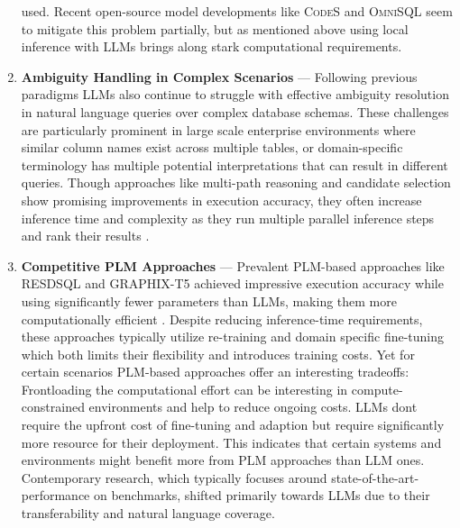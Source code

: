 \begin{enumerate}
           used. Recent open-source model developments like \textsc{CodeS} and \textsc{OmniSQL} seem to mitigate this
           problem partially, but as mentioned above using local inference with LLMs brings along stark computational
           requirements.
    \item \textbf{Ambiguity Handling in Complex Scenarios} — Following previous paradigms LLMs also continue to struggle
           with effective ambiguity resolution in natural language queries over complex database schemas. These challenges
           are particularly prominent in large scale enterprise environments where similar column names exist across multiple
           tables, or domain-specific terminology has multiple potential interpretations that can result in different queries.
           Though approaches like multi-path reasoning and candidate selection show promising improvements in execution
           accuracy, they often increase inference time and complexity as they run multiple parallel inference steps and
           rank their results \citep{CHASE, XiYan}.
    \item \textbf{Competitive PLM Approaches} — Prevalent PLM-based approaches like RESDSQL and GRAPHIX-T5 achieved 
           impressive execution accuracy while using significantly fewer parameters than LLMs, making them more computationally
           efficient \citep{RESDSQL}. Despite reducing inference-time requirements, these approaches typically utilize
           re-training and domain specific fine-tuning which both limits their flexibility and introduces training costs.
           Yet for certain scenarios PLM-based approaches offer an interesting tradeoffs: Frontloading the computational effort
           can be interesting in compute-constrained environments and help to reduce ongoing costs. LLMs dont require the upfront
           cost of fine-tuning and adaption but require significantly more resource for their deployment. This indicates
           that certain systems and environments might benefit more from PLM approaches than LLM ones. Contemporary research,
           which typically focuses around state-of-the-art-performance on benchmarks, shifted primarily towards LLMs due to
           their transferability and natural language coverage.
\end{enumerate}
